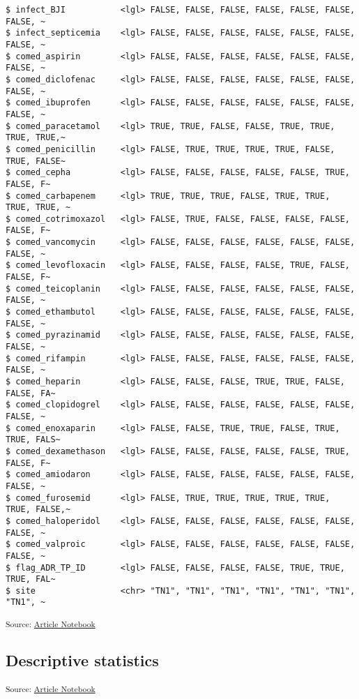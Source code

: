 \documentclass[
  letterpaper,
  DIV=11,
  numbers=noendperiod]{scrartcl}
\begin{document}
\begin{verbatim}
$ infect_BJI           <lgl> FALSE, FALSE, FALSE, FALSE, FALSE, FALSE, FALSE, ~
$ infect_septicemia    <lgl> FALSE, FALSE, FALSE, FALSE, FALSE, FALSE, FALSE, ~
$ comed_aspirin        <lgl> FALSE, FALSE, FALSE, FALSE, FALSE, FALSE, FALSE, ~
$ comed_diclofenac     <lgl> FALSE, FALSE, FALSE, FALSE, FALSE, FALSE, FALSE, ~
$ comed_ibuprofen      <lgl> FALSE, FALSE, FALSE, FALSE, FALSE, FALSE, FALSE, ~
$ comed_paracetamol    <lgl> TRUE, TRUE, FALSE, FALSE, TRUE, TRUE, TRUE, TRUE,~
$ comed_penicillin     <lgl> FALSE, TRUE, TRUE, TRUE, TRUE, FALSE, TRUE, FALSE~
$ comed_cepha          <lgl> FALSE, FALSE, FALSE, FALSE, FALSE, TRUE, FALSE, F~
$ comed_carbapenem     <lgl> TRUE, TRUE, TRUE, FALSE, TRUE, TRUE, TRUE, TRUE, ~
$ comed_cotrimoxazol   <lgl> FALSE, TRUE, FALSE, FALSE, FALSE, FALSE, FALSE, F~
$ comed_vancomycin     <lgl> FALSE, FALSE, FALSE, FALSE, FALSE, FALSE, FALSE, ~
$ comed_levofloxacin   <lgl> FALSE, FALSE, FALSE, FALSE, TRUE, FALSE, FALSE, F~
$ comed_teicoplanin    <lgl> FALSE, FALSE, FALSE, FALSE, FALSE, FALSE, FALSE, ~
$ comed_ethambutol     <lgl> FALSE, FALSE, FALSE, FALSE, FALSE, FALSE, FALSE, ~
$ comed_pyrazinamid    <lgl> FALSE, FALSE, FALSE, FALSE, FALSE, FALSE, FALSE, ~
$ comed_rifampin       <lgl> FALSE, FALSE, FALSE, FALSE, FALSE, FALSE, FALSE, ~
$ comed_heparin        <lgl> FALSE, FALSE, FALSE, TRUE, TRUE, FALSE, FALSE, FA~
$ comed_clopidogrel    <lgl> FALSE, FALSE, FALSE, FALSE, FALSE, FALSE, FALSE, ~
$ comed_enoxaparin     <lgl> FALSE, FALSE, TRUE, TRUE, FALSE, TRUE, TRUE, FALS~
$ comed_dexamethason   <lgl> FALSE, FALSE, FALSE, FALSE, FALSE, TRUE, FALSE, F~
$ comed_amiodaron      <lgl> FALSE, FALSE, FALSE, FALSE, FALSE, FALSE, FALSE, ~
$ comed_furosemid      <lgl> FALSE, TRUE, TRUE, TRUE, TRUE, TRUE, TRUE, FALSE,~
$ comed_haloperidol    <lgl> FALSE, FALSE, FALSE, FALSE, FALSE, FALSE, FALSE, ~
$ comed_valproic       <lgl> FALSE, FALSE, FALSE, FALSE, FALSE, FALSE, FALSE, ~
$ flag_ADR_TP_ID       <lgl> FALSE, FALSE, FALSE, FALSE, TRUE, TRUE, TRUE, FAL~
$ site                 <chr> "TN1", "TN1", "TN1", "TN1", "TN1", "TN1", "TN1", ~
\end{verbatim}

\textsubscript{Source:
\href{https://AnTangQuoc.github.io/LZD-TP-pred-model/index-preview.html}{Article
Notebook}}

\subsection{Descriptive statistics}\label{descriptive-statistics}

\textsubscript{Source:
\href{https://AnTangQuoc.github.io/LZD-TP-pred-model/index-preview.html}{Article
Notebook}}
\end{document}
